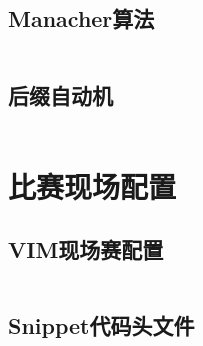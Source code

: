 \documentclass[a4paper,12pt]{article}
\begin{document}
\subsection{Manacher算法}
\inputminted[breaklines]{c++}{string/manacher.cc}
\subsection{后缀自动机}
\inputminted[breaklines]{c++}{string/suffix-automaton.cc}


\newpage
\section{比赛现场配置}
\subsection{VIM现场赛配置}
\inputminted[breaklines]{bash}{others/vim.bash}
\subsection{Snippet代码头文件}
\inputminted[breaklines]{c++}{others/head.cc}
\end{document}
